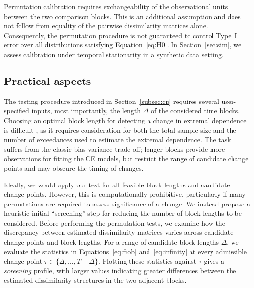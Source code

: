 \documentclass[APA,STIX1COL]{WileyNJD-v2}
\begin{document}
Permutation calibration requires exchangeability of the observational units between the two comparison blocks. This is an additional assumption and does not follow from equality of the pairwise dissimilarity matrices alone. Consequently, the permutation procedure is not guaranteed to control Type~I error over all distributions satisfying Equation~\eqref{eq:H0}. In Section~\ref{sec:sim}, we assess calibration under temporal stationarity in a synthetic data setting.
\subsection{Practical aspects}
\label{subsec:screen}

The testing procedure introduced in Section~\ref{subsec:cp} requires several user-specified inputs, most importantly, the length $\Delta$ of the considered time blocks. Choosing an optimal block length for detecting a change in extremal dependence is difficult \citep{McGonigle2025}, as it requires consideration for both the total sample size and the number of exceedances used to estimate the extremal dependence. The task suffers from the classic bias-variance trade-off; longer blocks provide more observations for fitting the CE models, but restrict the range of candidate change points and may obscure the timing of changes. 

Ideally, we would apply our test for all feasible block lengths and candidate change points. However, this is computationally prohibitive, particularly if many permutations are required to assess significance of a change. We instead propose a heuristic initial ``screening'' step for reducing the number of block lengths to be considered. Before performing the permutation tests, we examine how the discrepancy between estimated dissimilarity matrices varies across candidate change points and block lengths. For a range of candidate block lengths $\Delta$, we evaluate the statistics in Equations~\eqref{eq:frob} and~\eqref{eq:infinity} at every admissible change point $\tau\in\{\Delta,\ldots,T-\Delta\}$. Plotting these statistics against $\tau$ gives a \textit{screening} profile, with larger values indicating greater differences between the estimated dissimilarity structures in the two adjacent blocks. 
\end{document}
